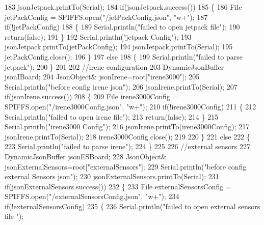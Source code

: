 \begin{DoxyCode}
183     jsonJetpack.printTo(Serial);
184     \textcolor{keywordflow}{if}(jsonJetpack.success())
185     \{   
186         File jetPackConfig = SPIFFS.open(\textcolor{stringliteral}{"/jetPackConfig.json"}, \textcolor{stringliteral}{"w+"});  
187         \textcolor{keywordflow}{if}(!jetPackConfig)
188         \{
189             Serial.println(\textcolor{stringliteral}{"failed to open jetpack file"});
190             \textcolor{keywordflow}{return}(\textcolor{keyword}{false});
191         \}
192         Serial.println(\textcolor{stringliteral}{"jetpack Config"});   
193         jsonJetpack.printTo(jetPackConfig);
194         jsonJetpack.printTo(Serial);
195         jetPackConfig.close();
196     \}
197     \textcolor{keywordflow}{else}
198     \{
199         Serial.println(\textcolor{stringliteral}{"failed to parse jetpack"});  
200     \}
201     
202     \textcolor{comment}{//irene configuration   }
203     DynamicJsonBuffer jsonIBoard;
204         JsonObject& jsonIrene=root[\textcolor{stringliteral}{"irene3000"}];
205     Serial.println(\textcolor{stringliteral}{"before config irene json"}); 
206     jsonIrene.printTo(Serial);
207     \textcolor{keywordflow}{if}(jsonIrene.success())
208     \{
209         File irene3000Config = SPIFFS.open(\textcolor{stringliteral}{"/irene3000Config.json"}, \textcolor{stringliteral}{"w+"});  
210         \textcolor{keywordflow}{if}(!irene3000Config)
211         \{
212             Serial.println(\textcolor{stringliteral}{"failed to open irene file"});
213             \textcolor{keywordflow}{return}(\textcolor{keyword}{false});
214         \}
215         Serial.println(\textcolor{stringliteral}{"irene3000 Config"});
216         jsonIrene.printTo(irene3000Config);
217         jsonIrene.printTo(Serial);
218         irene3000Config.close();
219     
220     \}
221     \textcolor{keywordflow}{else}
222     \{
223         Serial.println(\textcolor{stringliteral}{"failed to parse irene"});    
224     \}
225     
226     \textcolor{comment}{//external sensors}
227     DynamicJsonBuffer jsonESBoard;
228         JsonObject& jsonExternalSensors=root[\textcolor{stringliteral}{"externalSensors"}];
229     Serial.println(\textcolor{stringliteral}{"before config external Sensors json"});
230     jsonExternalSensors.printTo(Serial);
231     \textcolor{keywordflow}{if}(jsonExternalSensors.success())
232     \{
233         File externalSensorsConfig = SPIFFS.open(\textcolor{stringliteral}{"/externalSensorsConfig.json"}, \textcolor{stringliteral}{"w+"});  
234         \textcolor{keywordflow}{if}(!externalSensorsConfig)
235         \{
236             Serial.println(\textcolor{stringliteral}{"failed to open external sensors file "});

\end{DoxyCode}
